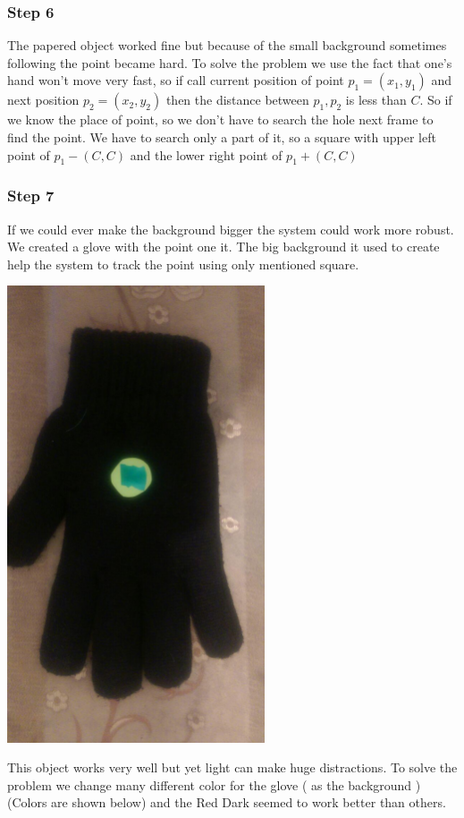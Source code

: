 \documentclass{report}
\begin{document}
\subsubsection{Step 6}
The papered object worked fine but because of the small background sometimes following the point became hard. To solve the problem we use the fact that one's hand won't move very fast, so if call current position of point $p_1 = (x_1, y_1)$ and next position $p_2 = (x_2, y_2)$ then the distance between $p_1, p_2$ is less than $C$. So if we know the place of point, so we don't have to search the hole next frame to find the point. We have to search only a part of it, so a square with upper left point of $p_1 - (C, C)$ and the lower right point of $p_1 + (C, C)$ 
\subsubsection{Step 7}
If we could ever make the background bigger the system could work more robust. We created a glove with the point one it. The big background it used to create help the system to track the point using only mentioned square. 
\begin{center}
	\includegraphics[width=3in]{Object7.jpg}
\end{center}
This object works very well but yet light can make huge distractions. To solve the problem we change many different color for the glove ( as the background ) (Colors are shown below) and the Red Dark seemed to work better than others. 
\end{document}

